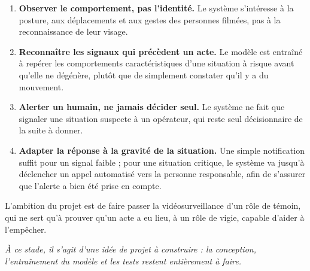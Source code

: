 \documentclass[11pt,a4paper]{article}
\begin{document}
\begin{enumerate}[leftmargin=1.4em, itemsep=2pt]
  \item \textbf{Observer le comportement, pas l'identité.} Le système s'intéresse à la posture, aux déplacements et aux gestes des personnes filmées, pas à la reconnaissance de leur visage.
  \item \textbf{Reconnaître les signaux qui précèdent un acte.} Le modèle est entraîné à repérer les comportements caractéristiques d'une situation à risque avant qu'elle ne dégénère, plutôt que de simplement constater qu'il y a du mouvement.
  \item \textbf{Alerter un humain, ne jamais décider seul.} Le système ne fait que signaler une situation suspecte à un opérateur, qui reste seul décisionnaire de la suite à donner.
  \item \textbf{Adapter la réponse à la gravité de la situation.} Une simple notification suffit pour un signal faible ; pour une situation critique, le système va jusqu'à déclencher un appel automatisé vers la personne responsable, afin de s'assurer que l'alerte a bien été prise en compte.
\end{enumerate}

L'ambition du projet est de faire passer la vidéosurveillance d'un rôle de témoin, qui ne sert qu'à prouver qu'un acte a eu lieu, à un rôle de vigie, capable d'aider à l'empêcher.

\vspace{1em}
\noindent\textit{À ce stade, il s'agit d'une idée de projet à construire : la conception, l'entraînement du modèle et les tests restent entièrement à faire.}
\end{document}
